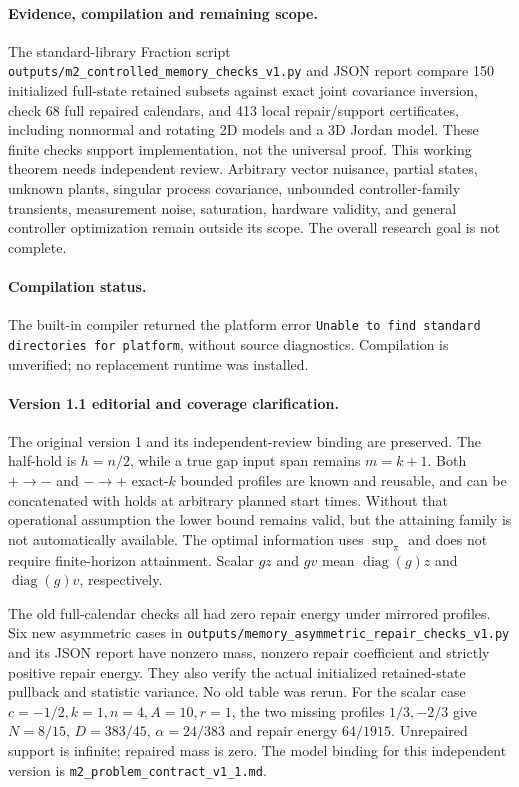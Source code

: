 \documentclass[11pt]{article}
\begin{document}
\paragraph{Evidence, compilation and remaining scope.}
The standard-library Fraction script
\texttt{outputs/m2\_controlled\_memory\_checks\_v1.py} and JSON report compare
150 initialized full-state retained subsets against exact joint covariance
inversion, check 68 full repaired calendars, and 413 local repair/support
certificates, including nonnormal and rotating 2D models and a 3D Jordan model.
These finite checks support implementation, not the universal proof.
This working theorem needs independent review.
Arbitrary vector nuisance, partial states, unknown plants, singular process
covariance, unbounded controller-family transients, measurement noise,
saturation, hardware validity, and general controller optimization remain
outside its scope. The overall research goal is not complete.
\paragraph{Compilation status.}
The built-in compiler returned the platform error
\texttt{Unable to find standard directories for platform}, without source
diagnostics. Compilation is unverified; no replacement runtime was installed.

\paragraph{Version 1.1 editorial and coverage clarification.}
The original version 1 and its independent-review binding are preserved.
The half-hold is $h=n/2$, while a true gap input span remains $m=k+1$.
Both $+\to-$ and $-\to+$ exact-$k$ bounded profiles are known and reusable,
and can be concatenated with holds at arbitrary planned start times.
Without that operational assumption the lower bound remains valid, but
the attaining family is not automatically available.
The optimal information uses $\sup_\pi$ and does not require finite-horizon
attainment. Scalar $gz$ and $gv$ mean $\operatorname{diag}(g)z$ and
$\operatorname{diag}(g)v$, respectively.

The old full-calendar checks all had zero repair energy under mirrored
profiles. Six new asymmetric cases in
\texttt{outputs/memory\_asymmetric\_repair\_checks\_v1.py}
and its JSON report have nonzero mass, nonzero repair coefficient and
strictly positive repair energy. They also verify the actual initialized
retained-state pullback and statistic variance. No old table was rerun.
For the scalar case $c=-1/2,k=1,n=4,A=10,r=1$, the two missing profiles
$1/3,-2/3$ give $N=8/15$, $D=383/45$, $\alpha=24/383$ and
repair energy $64/1915$. Unrepaired support is infinite; repaired mass is zero.
The model binding for this independent version is
\texttt{m2\_problem\_contract\_v1\_1.md}.
\end{document}
